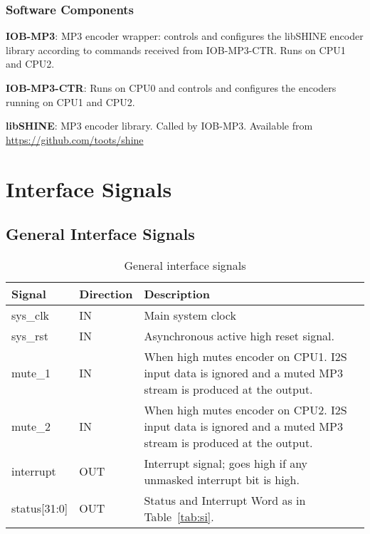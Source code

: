\documentclass{ug}
\theoremstyle{plain}
\begin{document}
\subsubsection{Software Components}

\begin{description}
\item {\bf IOB-MP3}: MP3 encoder wrapper: controls and configures the
  libSHINE encoder library according to commands received from
  IOB-MP3-CTR. Runs on CPU1 and CPU2.
\item {\bf IOB-MP3-CTR}: Runs on CPU0 and controls and configures the
  encoders running on CPU1 and CPU2.
\item {\bf libSHINE}: MP3 encoder library. Called by IOB-MP3. Available from
  \url{https://github.com/toots/shine}
\end{description}

\section{Interface Signals}

\subsection{General Interface Signals}

\begin{table}[H]
  \begin{center}
    \begin{tabular}{|l|l|p{8cm}|}
      \hline
      \rowcolor{iob-green}
      \textbf{Signal} & \textbf{Direction} & \textbf{Description} \\
      \hline
      \hline

      sys\_clk &  IN & Main system clock \\
      \hline

      \rowcolor{iob-blue} sys\_rst & IN & Asynchronous active high reset
      signal. \\ \hline

      mute\_1 & IN & When high mutes encoder on CPU1. I2S input data
      is ignored and a muted MP3 stream is produced at the
      output. \\ \hline

      \rowcolor{iob-blue}
      mute\_2 & IN & When high mutes encoder on CPU2. I2S input data
      is ignored and a muted MP3 stream is produced at the
      output. \\ \hline

      interrupt & OUT & Interrupt signal; goes high if any
      unmasked interrupt bit is high.\\ \hline

      status[31:0] & OUT & Status and Interrupt Word as in Table~\ref{tab:si}.\\ \hline

    \end{tabular}
    \caption{General interface signals}
    \label{tab:is}
  \end{center}
\end{table}
\end{document}
